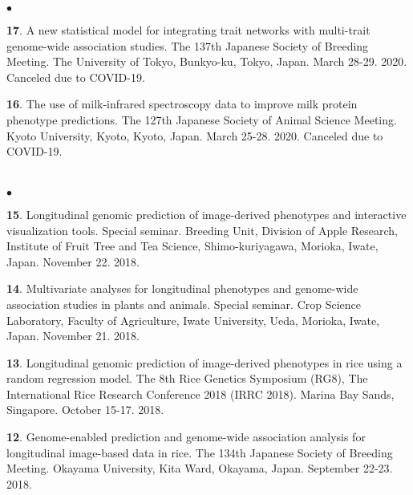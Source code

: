 \documentclass[margin,line,10pt]{res}
\newenvironment{list2}{
  \begin{list}{$\bullet$}{%
      \setlength{\itemsep}{0in}
      \setlength{\parsep}{0in} \setlength{\parskip}{0in}
      \setlength{\topsep}{0in} \setlength{\partopsep}{0in} 
      \setlength{\leftmargin}{0.2in}}}{\end{list}}
\begin{document}
\begin{resume}
\begin{list2}
  \item [{\bf 17}.] A new statistical model for integrating trait networks with multi-trait genome-wide association studies. The 137th Japanese Society of Breeding Meeting. The University of Tokyo, Bunkyo-ku, Tokyo, Japan. March 28-29. 2020. Canceled due to COVID-19.
 
  \vspace{0.5cm}
  
  \item [{\bf 16}.] The use of milk-infrared spectroscopy data to improve milk protein phenotype predictions. The 127th Japanese Society of Animal Science Meeting. Kyoto University, Kyoto, Kyoto, Japan. March 25-28. 2020. Canceled due to COVID-19.
  
\end{list2}  



\section{}
\begin{list2}

\item [{\bf 15}.] Longitudinal genomic prediction of image-derived phenotypes and interactive visualization tools. Special seminar. Breeding Unit, Division of Apple Research, Institute of Fruit Tree and Tea Science, Shimo-kuriyagawa, Morioka, Iwate, Japan. November 22. 2018.
  
  \vspace{0.5cm}
  
\item [{\bf 14}.] Multivariate analyses for longitudinal phenotypes and genome-wide association studies in plants and animals. Special seminar. Crop Science Laboratory, Faculty of Agriculture, Iwate University, Ueda, Morioka, Iwate, Japan. November 21. 2018.
  
  \vspace{0.5cm}

\item [{\bf 13}.] Longitudinal genomic prediction of image-derived phenotypes in rice using a random regression model. The 8th Rice Genetics Symposium (RG8), The International Rice Research Conference 2018 (IRRC 2018). Marina Bay Sands, Singapore. October 15-17. 2018.
  
  \vspace{0.5cm}
  
\item [{\bf 12}.] Genome-enabled prediction and genome-wide association analysis for longitudinal image-based data in rice. The 134th Japanese Society of Breeding Meeting. Okayama University, Kita Ward, Okayama, Japan. September 22-23. 2018.
  

\end{list2}
\end{resume}
\end{document}
